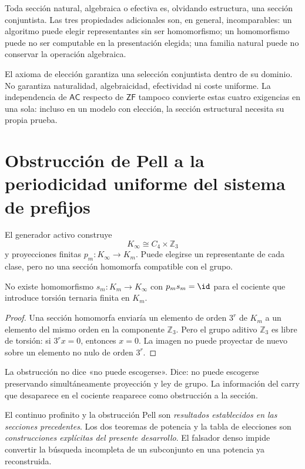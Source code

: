 Toda sección natural, algebraica o efectiva es, olvidando estructura, una
sección conjuntista. Las tres propiedades adicionales son, en general,
incomparables: un algoritmo puede elegir representantes sin ser homomorfismo;
un homomorfismo puede no ser computable en la presentación elegida; una
familia natural puede no conservar la operación algebraica.

\begin{remark}
El axioma de elección garantiza una selección conjuntista dentro de su
dominio. No garantiza naturalidad, algebraicidad, efectividad ni coste
uniforme. La independencia de \(\mathsf{AC}\) respecto de \(\mathsf{ZF}\)
tampoco convierte estas cuatro exigencias en una sola: incluso en un modelo
con elección, la sección estructural necesita su propia prueba.
\end{remark}

\section{Obstrucción de Pell a la periodicidad uniforme del sistema de prefijos}

El generador activo construye
\[
  K_\infty\cong C_4\times\mathbb Z_3
\]
y proyecciones finitas \(p_m:K_\infty\to K_m\). Puede elegirse un
representante de cada clase, pero no una sección homomorfa compatible con el
grupo.

\begin{proposition}
No existe homomorfismo \(s_m:K_m\to K_\infty\) con
\(p_ms_m=\id\) para el cociente que introduce torsión ternaria finita en
\(K_m\).
\end{proposition}

\begin{proof}
Una sección homomorfa enviaría un elemento de orden \(3^r\) de \(K_m\) a un
elemento del mismo orden en la componente \(\mathbb Z_3\). Pero el grupo
aditivo \(\mathbb Z_3\) es libre de torsión: si \(3^rx=0\), entonces \(x=0\).
La imagen no puede proyectar de nuevo sobre un elemento no nulo de orden
\(3^r\).
\end{proof}

La obstrucción no dice «no puede escogerse». Dice: no puede escogerse
preservando simultáneamente proyección y ley de grupo. La información del
carry que desaparece en el cociente reaparece como obstrucción a la sección.

\begin{remark}
El continuo profinito y la obstrucción Pell son
\emph{resultados establecidos en las secciones precedentes}. Los dos teoremas de potencia y la tabla de
elecciones son \emph{construcciones explícitas del presente desarrollo}. El falsador denso impide
convertir la búsqueda incompleta de un subconjunto en una potencia ya
reconstruida.
\end{remark}
